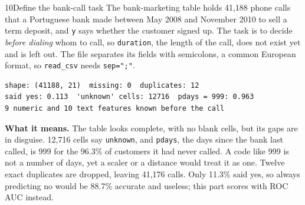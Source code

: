 
\begin{labquestion}{10}{Define the bank-call task}
The bank-marketing table holds 41,188 phone calls that a Portuguese bank made between May 2008 and November 2010 to sell a term deposit, and \texttt{y} says whether the customer signed up. The task is to decide \emph{before dialing} whom to call, so \texttt{duration}, the length of the call, does not exist yet and is left out. The file separates its fields with semicolons, a common European format, so \texttt{read\_csv} needs \texttt{sep=";"}.
\end{labquestion}
\begin{labanswer}

\begin{refoutput}
\begin{lstlisting}[style=utpterminal]
shape: (41188, 21)  missing: 0  duplicates: 12
said yes: 0.113  'unknown' cells: 12716  pdays = 999: 0.963
9 numeric and 10 text features known before the call
\end{lstlisting}
\end{refoutput}

\textbf{What it means.} The table looks complete, with no blank cells, but its gaps are in disguise. 12,716 cells say \texttt{unknown}, and \texttt{pdays}, the days since the bank last called, is 999 for the 96.3\% of customers it had never called. A code like 999 is not a number of days, yet a scaler or a distance would treat it as one. Twelve exact duplicates are dropped, leaving 41,176 calls. Only 11.3\% said yes, so always predicting no would be 88.7\% accurate and useless; this part scores with ROC AUC instead.
\end{labanswer}

